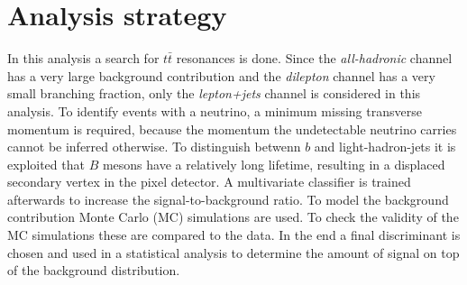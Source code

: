 \section{Analysis strategy}
\label{sec:Durchführung}
In this analysis a search for $t\bar{t}$ resonances is done. Since the \textit{all-hadronic} channel has a very large background contribution and the \textit{dilepton} channel has a very small branching fraction, only the \textit{lepton+jets} channel is considered in this analysis.
To identify events with a neutrino, a minimum missing transverse momentum is required, because the momentum the undetectable neutrino carries cannot be inferred otherwise. To distinguish betwenn $b$ and light-hadron-jets it is exploited that $B$ mesons have a relatively long lifetime, resulting in a displaced secondary vertex in the pixel detector. A multivariate classifier is trained afterwards to increase the signal-to-background ratio. To model the background contribution Monte Carlo (MC) simulations are used. To check the validity of the MC simulations these are compared to the data. In the end a final discriminant is chosen and used in a statistical analysis to determine the amount of signal on top of the background distribution.
